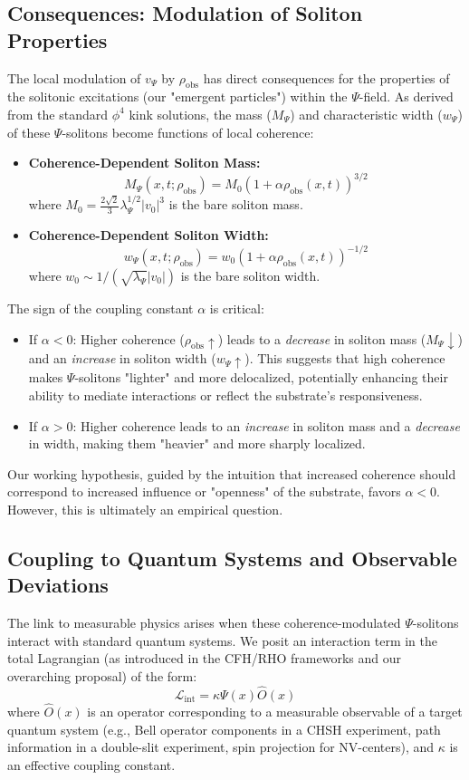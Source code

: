 \documentclass[11pt, a4paper]{book}
\begin{document}
\subsection{Consequences: Modulation of Soliton Properties}
\label{ssec:coherencemodulation_consequences}
The local modulation of $v_\Psi$ by $\rho_{\text{obs}}$ has direct consequences for the properties of the solitonic excitations (our "emergent particles") within the $\Psi$-field. As derived from the standard $\phi^4$ kink solutions, the mass ($M_\Psi$) and characteristic width ($w_\Psi$) of these $\Psi$-solitons become functions of local coherence:
\begin{itemize}
    \item \textbf{Coherence-Dependent Soliton Mass:}
    \[ M_\Psi(x,t; \rho_{\text{obs}}) = M_0 \left(1 + \alpha \rho_{\text{obs}}(x,t)\right)^{3/2} \]
    where $M_0 = \frac{2\sqrt{2}}{3} \lambda_\Psi^{1/2} |v_0|^3$ is the bare soliton mass.
    \item \textbf{Coherence-Dependent Soliton Width:}
    \[ w_\Psi(x,t; \rho_{\text{obs}}) = w_0 \left(1 + \alpha \rho_{\text{obs}}(x,t)\right)^{-1/2} \]
    where $w_0 \sim 1/(\sqrt{\lambda_\Psi} |v_0|)$ is the bare soliton width.
\end{itemize}
The sign of the coupling constant $\alpha$ is critical:
\begin{itemize}
    \item If $\alpha < 0$: Higher coherence ($\rho_{\text{obs}} \uparrow$) leads to a \emph{decrease} in soliton mass ($M_\Psi \downarrow$) and an \emph{increase} in soliton width ($w_\Psi \uparrow$). This suggests that high coherence makes $\Psi$-solitons "lighter" and more delocalized, potentially enhancing their ability to mediate interactions or reflect the substrate's responsiveness.
    \item If $\alpha > 0$: Higher coherence leads to an \emph{increase} in soliton mass and a \emph{decrease} in width, making them "heavier" and more sharply localized.
\end{itemize}
Our working hypothesis, guided by the intuition that increased coherence should correspond to increased influence or "openness" of the substrate, favors $\alpha < 0$. However, this is ultimately an empirical question.

\subsection{Coupling to Quantum Systems and Observable Deviations}
\label{ssec:coherencemodulation_coupling}
The link to measurable physics arises when these coherence-modulated $\Psi$-solitons interact with standard quantum systems. We posit an interaction term in the total Lagrangian (as introduced in the CFH/RHO frameworks and our overarching proposal) of the form:
\[ \mathcal{L}_{\text{int}} = \kappa \Psi(x) \hat{O}(x) \]
where $\hat{O}(x)$ is an operator corresponding to a measurable observable of a target quantum system (e.g., Bell operator components in a CHSH experiment, path information in a double-slit experiment, spin projection for NV-centers), and $\kappa$ is an effective coupling constant.
\end{document}
